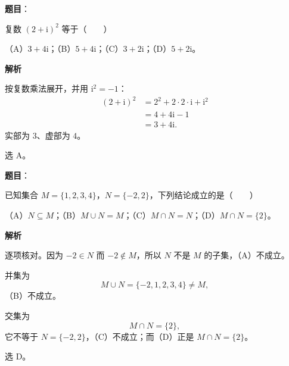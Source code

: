 

\begin{answer}

\textbf{题目}：

复数 $(2+\mathrm i)^2$ 等于\mbox{（　　）}

（A）$3+4\mathrm i$；（B）$5+4\mathrm i$；（C）$3+2\mathrm i$；（D）$5+2\mathrm i$。

\textbf{解析}

按复数乘法展开，并用 $\mathrm i^2=-1$：
\nopagebreak[4]
\[\begin{aligned}
(2+\mathrm i)^2&=2^2+2\cdot2\cdot\mathrm i+\mathrm i^2\\
&=4+4\mathrm i-1\\
&=3+4\mathrm i.
\end{aligned}\]
实部为 $3$、虚部为 $4$。

选 A。


\end{answer}
\begin{answer}

\textbf{题目}：

已知集合 $M=\{1,2,3,4\}$，$N=\{-2,2\}$，下列结论成立的是\mbox{（　　）}

（A）$N\subseteq M$；（B）$M\cup N=M$；（C）$M\cap N=N$；（D）$M\cap N=\{2\}$。

\textbf{解析}

逐项核对。因为 $-2\in N$ 而 $-2\notin M$，所以 $N$ 不是 $M$ 的子集，（A）不成立。

并集为
\nopagebreak[4]
\[M\cup N=\{-2,1,2,3,4\}\neq M,\]
（B）不成立。

交集为
\nopagebreak[4]
\[M\cap N=\{2\},\]
它不等于 $N=\{-2,2\}$，（C）不成立；而（D）正是 $M\cap N=\{2\}$。

选 D。


\end{answer}
